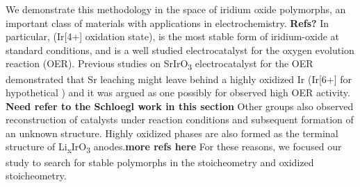 

We demonstrate this methodology in the space of iridium oxide polymorphs,
an important class of materials with applications in electrochemistry. \textbf{Refs?}
%
In particular, \rIrOtwo (Ir[4+] oxidation state), is the most stable form  %
of iridium-oxide at standard conditions,
and is a well studied electrocatalyst for the oxygen evolution reaction (OER).
\cite{Seitz2016,Lee2012a,McCrory2015,Trotochaud2012,Danilovic2014,Carmo2013,Miles1978,Beni1979}
%
Previous studies on SrIrO\textsubscript{3} electrocatalyst for the OER demonstrated that Sr leaching might leave behind a highly oxidized Ir (Ir[6+] for hypothetical \IrOthree) and it was argued as one possibly for observed high OER activity.\cite{Seitz2016}  \textbf{Need refer to the Schloegl work in this section}
%
Other groups also observed reconstruction of \IrOx catalysts under reaction conditions and subsequent formation of an unknown structure. \cite{Pearce2017} 
%
Highly oxidized \IrOthree phases are also formed as the terminal structure of Li\textsubscript{x}IrO\textsubscript{3} anodes.\cite{Pearce2017}\textbf{more refs here}
%
For these reasons, we focused our study to search for stable polymorphs in the \IrOtwo stoicheometry and  oxidized \IrOthree stoicheometry.
%
%


